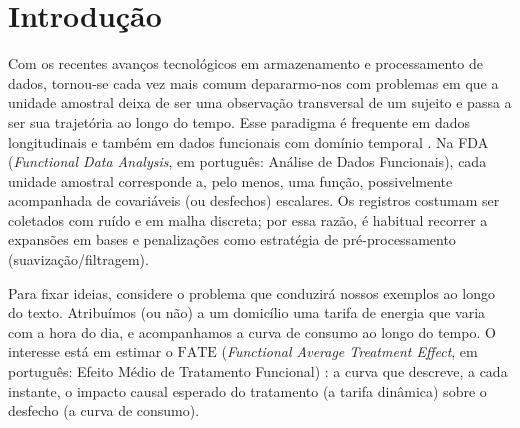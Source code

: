 \chapter[Introdução]{Introdução}\label{sec-introducao}

Com os recentes avanços tecnológicos em armazenamento e processamento de dados, tornou-se cada vez mais comum depararmo-nos com problemas em que a unidade amostral deixa de ser uma observação transversal de um sujeito e passa a ser sua trajetória ao longo do tempo. 
Esse paradigma é frequente em dados longitudinais e também em dados funcionais com domínio temporal \cite{diggle_analysis_2013, ramsay_functional_2005}.
Na FDA (\emph{Functional Data Analysis}, em português: Análise de Dados Funcionais), cada unidade amostral corresponde a, pelo menos, uma função, possivelmente acompanhada de covariáveis (ou desfechos) escalares. 
Os registros costumam ser coletados com ruído e em malha discreta; por essa razão, é habitual recorrer a expansões em bases e penalizações como estratégia de pré-processamento (suavização/filtragem).

Para fixar ideias, considere o problema que conduzirá nossos exemplos ao longo do texto. 
Atribuímos (ou não) a um domicílio uma tarifa de energia que varia com a hora do dia, e acompanhamos a curva de consumo ao longo do tempo. 
O interesse está em estimar o \(\mathrm{FATE}\) (\emph{Functional Average Treatment Effect}, em português: Efeito Médio de Tratamento Funcional) \cite{ecker_causal_2024}: a curva que descreve, a cada instante, o impacto causal esperado do tratamento (a tarifa dinâmica) sobre o desfecho (a curva de consumo).

